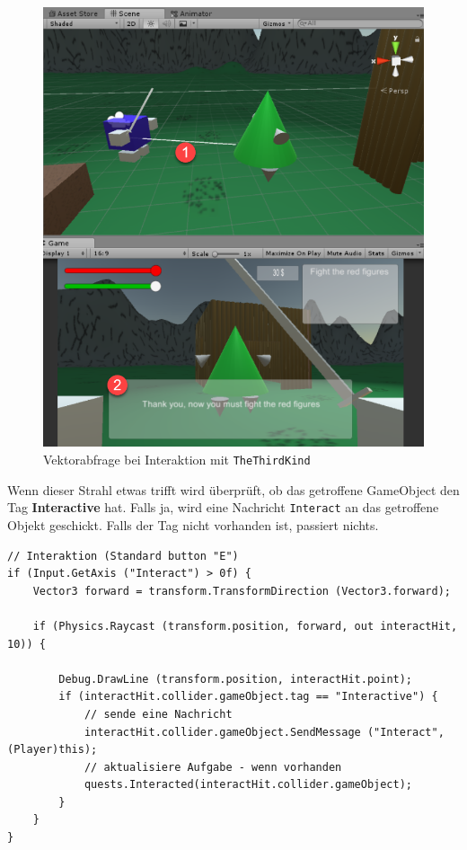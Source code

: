 \begin{figure}[H]
\includegraphics[scale=0.5]{screenshots/raycastthirdkind.png}
\caption{Vektorabfrage bei Interaktion mit \lstinline{TheThirdKind}}
\end{figure}

Wenn dieser Strahl etwas trifft wird überprüft, ob das getroffene GameObject den Tag \textbf{Interactive} hat. Falls ja, wird eine Nachricht \lstinline{Interact} an das getroffene Objekt geschickt. Falls der Tag nicht vorhanden ist, passiert nichts.

\begin{lstlisting}[caption={Auslösen der Interaktion}]
// Interaktion (Standard button "E")
if (Input.GetAxis ("Interact") > 0f) {
	Vector3 forward = transform.TransformDirection (Vector3.forward);

	if (Physics.Raycast (transform.position, forward, out interactHit, 10)) {	
		
		Debug.DrawLine (transform.position, interactHit.point);
		if (interactHit.collider.gameObject.tag == "Interactive") {
			// sende eine Nachricht
			interactHit.collider.gameObject.SendMessage ("Interact", (Player)this);
			// aktualisiere Aufgabe - wenn vorhanden
			quests.Interacted(interactHit.collider.gameObject);
		}
	}	
}
\end{lstlisting}

